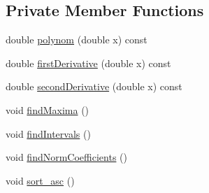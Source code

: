 \subsection*{Private Member Functions}
\begin{DoxyCompactItemize}
\item 
double \hyperlink{class_p_c_a_1_1_double_well_rand_a345fbcb1a01172464184b418ee761442}{polynom} (double x) const
\item 
double \hyperlink{class_p_c_a_1_1_double_well_rand_ab3817725d51a9171ef6a7e6a72ce25ef}{first\+Derivative} (double x) const
\item 
double \hyperlink{class_p_c_a_1_1_double_well_rand_a20c4fa6e77dad5161a214706adeda281}{second\+Derivative} (double x) const
\item 
void \hyperlink{class_p_c_a_1_1_double_well_rand_aa798efa59786f8aeeafb198f4a3319a3}{find\+Maxima} ()
\item 
void \hyperlink{class_p_c_a_1_1_double_well_rand_a89905058cce9c8bbecd5a0dabd21ea3c}{find\+Intervals} ()
\item 
void \hyperlink{class_p_c_a_1_1_double_well_rand_ab4d8dfc2a37b647e55fd18cc1d8e11f9}{find\+Norm\+Coefficients} ()
\item 
void \hyperlink{class_p_c_a_1_1_double_well_rand_a60ad7eeeb8f90a0e7312689820591674}{sort\+\_\+asc} ()
\end{DoxyCompactItemize}
